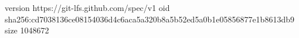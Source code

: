 version https://git-lfs.github.com/spec/v1
oid sha256:cd7038136ce08154036d4c6aca5a320b8a5b52ed5a0b1e05856877e1b8613db9
size 1048672
